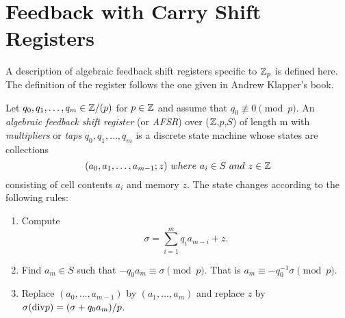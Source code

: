 \section{Feedback with Carry Shift Registers}
\par A description of algebraic feedback shift registers specific to $\mathbb{Z}_p$ is defined here.
The definition of the register follows the one given in Andrew Klapper's book.

\begin{definition}\label{afsr}
  Let $q_0,q_1,\dots,q_m\in\mathbb{Z}/(p)$ for $p\in\mathbb{Z}$ and assume that $q_0\not\equiv0\pmod p$.
  An {\em algebraic feedback shift register} (or {\em AFSR}) over ($\mathbb{Z}$,$p$,$S$) of length m with
  {\em multipliers} or {\em taps} $q_0,q_1,\dots,q_m$ is a discrete state machine whose states are
  collections
  \[
  (a_0,a_1,\dots,a_{m-1};z) \ where \ a_i\in S \ and \ z \in \zzz
  \]
  consisting of cell contents $a_i$ and memory $z$. The state changes according to the
  following rules:
  \begin{enumerate}[1.]
    \item Compute
      \[
      \sigma = \sum^m_{i=1}q_ia_{m-i}+z.
      \]
    \item Find $a_m\in S$ such that $-q_0a_m\equiv\sigma\pmod p$. That is $a_m\equiv-q_{0}^{-1}\sigma\pmod p$.
    \item Replace $(a_0,\dots,a_{m-1})$ by $(a_1,\dots,a_m)$ and replace $z$ by $\sigma({\rm div} p) = (\sigma+q_0a_m)/p$.
  \end{enumerate}
\end{definition}
